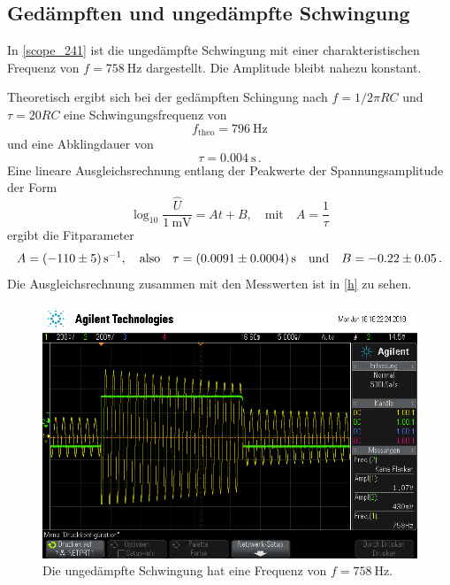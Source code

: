 \FloatBarrier

\subsection{Ged\"{a}mpften und unged\"{a}mpfte Schwingung}

In \autoref{scope_241} ist die ungedämpfte Schwingung mit einer charakteristischen Frequenz von $f = \SI{758}{\hertz}$ dargestellt. Die Amplitude bleibt nahezu konstant.\par
Theoretisch ergibt sich bei der gedämpften Schingung nach $f = 1 / 2\pi RC$ und $\tau = 20RC$ eine Schwingungsfrequenz von
\begin{equation*}
	f_\text{theo} = \SI{796}{\hertz}
\end{equation*}
und eine Abklingdauer von
\begin{equation*}
	\tau = \SI{0.004}{\second}\,.
\end{equation*}
Eine lineare Ausgleichsrechnung entlang der Peakwerte der Spannungsamplitude der Form
\begin{equation}
	\log_{10} \frac{\hat{U}}{\SI{1}{\milli\volt}} = At + B, \quad \text{mit} \quad A = \frac{1}{\tau}
\end{equation}
ergibt die Fitparameter
\begin{equation*}
	A = \SI[separate-uncertainty = true]{-110 (5)}{\per\second}, \quad \text{also} \quad \tau = \SI[separate-uncertainty = true]{0.0091 (4)}{\second} \quad \text{und} \quad B = -0.22 \pm 0.05\,.
\end{equation*}
Die Ausgleichsrechnung zusammen mit den Messwerten ist in \autoref{h} zu sehen.
\begin{figure}[h]
	\centering
	\includegraphics[width=\textwidth]{usb/scope_241.png}
	\caption{Die ungedämpfte Schwingung hat eine Frequenz von $f = \SI{758}{\hertz}$.}
	\label{scope_241}
\end{figure}
